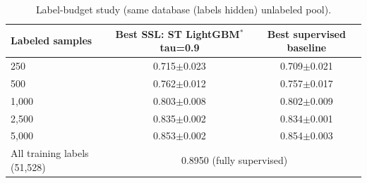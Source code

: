 \begin{table}[H]
\centering\small
\begin{tabular}{lcc}
\toprule
Labeled samples & Best SSL: ST LightGBM$^*$ tau=0.9 & Best supervised baseline\\
\midrule
250 & 0.715$\pm$0.023 & 0.709$\pm$0.021 \\
500 & 0.762$\pm$0.012 & 0.757$\pm$0.017 \\
1,000 & 0.803$\pm$0.008 & 0.802$\pm$0.009 \\
2,500 & 0.835$\pm$0.002 & 0.834$\pm$0.001 \\
5,000 & 0.853$\pm$0.002 & 0.854$\pm$0.003 \\
\midrule
All training labels (51,528) & \multicolumn{2}{c}{0.8950 (fully supervised)}\\
\bottomrule
\end{tabular}
\caption*{Label-budget study (same database (labels hidden) unlabeled pool).}
\end{table}
